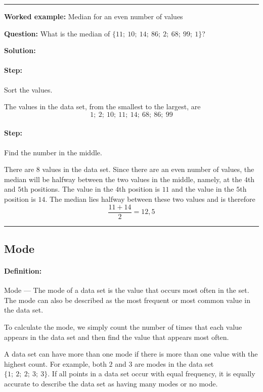 \documentclass[a4paper,11pt]{report}
\def\Definition#1#2{\paragraph{Definition:} #1 --- #2}
\newenvironment{wex}[3]%
{\rule{\linewidth}{0.5mm}
\textbf{Worked example:} #1

\textbf{Question:} #2

\textbf{Solution:} #3}%
{\rule{\linewidth}{0.5mm}}
\newcommand{\westep}[1]{\paragraph{Step:} #1}
\begin{document}
\begin{wex}{Median for an even number of values}{
  What is the median of $\{11;\ 10;\ 14;\ 86;\ 2;\ 68;\ 99;\ 1\}$?
}{
  \westep{Sort the values.}

  The values in the data set, from the smallest to the largest, are
  \begin{equation}
    1;\ 2;\ 10;\ 11;\ 14;\ 68;\ 86;\ 99
  \end{equation}

  \westep{Find the number in the middle.}

  There are $8$ values in the data set. Since there are an even number
  of values, the median will be halfway between the two values in the
  middle, namely, at the $4$th and $5$th positions. The value in the
  $4$th position is $11$ and the value in the $5$th position is
  $14$. The median lies halfway between these two values and is
  therefore
  \begin{equation}
    \frac{11+14}{2} = 12,5
  \end{equation}
}
\end{wex}

\subsection{Mode}
\Definition{Mode}{
  The mode of a data set is the value that occurs most often in the
  set. The mode can also be described as the most frequent or most
  common value in the data set.}

To calculate the mode, we simply count the number of times that each
value appears in the data set and then find the value that appears
most often.

A data set can have more than one mode if there is more than one value
with the highest count. For example, both $2$ and $3$ are modes in the
data set $\{1;\ 2;\ 2;\ 3;\ 3\}$. If all points in a data set occur
with equal frequency, it is equally accurate to describe the data set
as having many modes or no mode.
\end{document}

